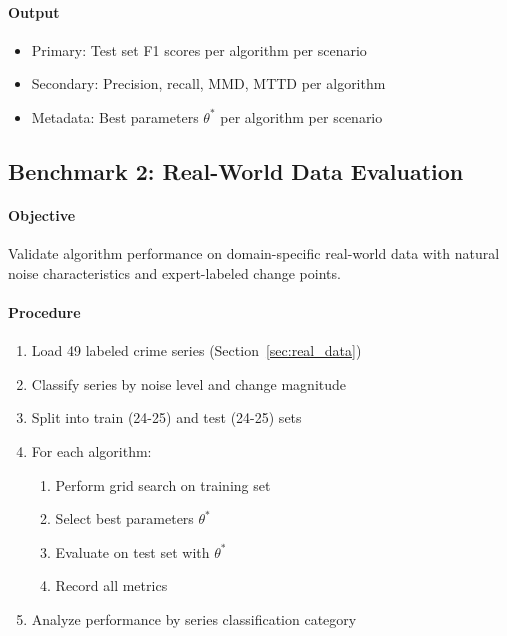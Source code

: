 \paragraph{Output}

\begin{itemize}
    \item Primary: Test set F1 scores per algorithm per scenario
    \item Secondary: Precision, recall, MMD, MTTD per algorithm
    \item Metadata: Best parameters $\theta^*$ per algorithm per scenario
\end{itemize}

\subsection{Benchmark 2: Real-World Data Evaluation}
\label{sec:benchmark2}

\paragraph{Objective}

Validate algorithm performance on domain-specific real-world data with natural noise characteristics and expert-labeled change points.

\paragraph{Procedure}

\begin{enumerate}
    \item Load 49 labeled crime series (Section~\ref{sec:real_data})
    \item Classify series by noise level and change magnitude
    \item Split into train (24-25) and test (24-25) sets
    \item For each algorithm:
    \begin{enumerate}
        \item Perform grid search on training set
        \item Select best parameters $\theta^*$
        \item Evaluate on test set with $\theta^*$
        \item Record all metrics
    \end{enumerate}
    \item Analyze performance by series classification category
\end{enumerate}


